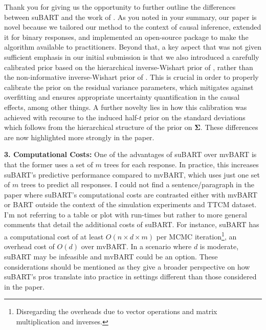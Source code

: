 \documentclass{article}
\begin{document}
Thank you for giving us the opportunity to further outline  the differences between suBART and the work of \citet{chakraborty2016bayesian}.
As you noted in your summary, our paper is novel because we tailored our method to the context of causal inference, extended it for binary responses, and implemented an open-source package to make the algorithm available to practitioners. Beyond that, a key aspect that was not given sufficient emphasis in our initial submission is that we also introduced a carefully calibrated prior based on the hierarchical inverse-Wishart prior of \citet{huang2013simple}, rather than the non-informative inverse-Wishart prior of \citet{chakraborty2016bayesian}. This is crucial in order to properly calibrate the prior on the residual variance parameters, which mitigates against overfitting and ensures appropriate uncertainty quantification in the causal effects, among other things. A further novelty lies in how this calibration was achieved with recourse to the induced half-$t$ prior on the standard deviations which follows from the hierarchical structure of the prior on $\boldsymbol{\Sigma}$. These differences are now highlighted more strongly in the paper.

\begin{mdframed}
 \textbf{3. Computational Costs:} One of the advantages of suBART over mvBART is that the former uses a set of $m$ trees for each response. In practice, this increases suBART's predictive performance compared to mvBART, which uses just one set of $m$ trees to predict all responses. I could not find a sentence/paragraph in the paper where suBART's computational costs are contrasted either with mvBART or BART outside the context of the simulation experiments and TTCM dataset. I'm not referring to a table or plot with run-times but rather to more general comments that detail the additional costs of suBART. For instance, suBART has a computational cost of at least $O(n\times d \times m)$ per MCMC iteration\footnote{Disregarding the overheads due to vector operations and matrix multiplication and inverses.}, an overhead cost of $O(d)$ over mvBART. In a scenario where $d$ is moderate, suBART may be infeasible and mvBART could be an option. These considerations should be mentioned as they give a broader perspective on how suBART's pros translate into practice in settings different than those considered in the paper.
\end{mdframed}
\end{document}
